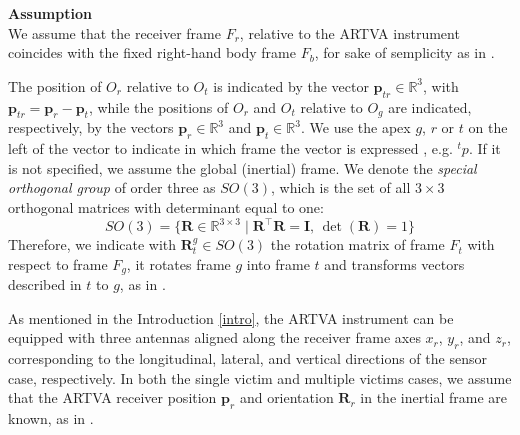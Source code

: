 \noindent
\textbf{Assumption}
\\
We assume that the receiver frame $F_r$, relative to the ARTVA
instrument coincides with the fixed right-hand body frame $F_b$, for sake of semplicity
as in \cite{similar-main}.

The position of $O_r$ relative to $O_t$ is indicated by the vector $\mathbf{p}_{tr} \in \mathbb{R}^3$, with $\mathbf{p}_{tr} = \mathbf{p}_r - \mathbf{p}_t$, 
while the positions of $O_r$ and $O_t$ relative to $O_g$ are indicated, respectively, by the vectors $\mathbf{p}_r \in \mathbb{R}^3$ and $\mathbf{p}_t \in \mathbb{R}^3$.
We use the apex $g$, $r$ or $t$ on the left of the vector to indicate in which frame the vector is expressed , e.g. ${}^t p$. 
If it is not specified, we assume the global (inertial) frame.
We denote the \textit{special orthogonal group} of order three as \( \textit{SO}(3) \), 
which is the set of all \( 3 \times 3 \) orthogonal matrices with determinant equal to one:
\[
\textit{SO}(3) = \{ \mathbf{R} \in \mathbb{R}^{3 \times 3} \mid \mathbf{R}^\top \mathbf{R} = \mathbf{I}, \, \det(\mathbf{R}) = 1 \}
\]
Therefore, we indicate with \( \mathbf{R}^g_t \in \textit{SO}(3) \) the rotation matrix of frame $F_t$ with respect to frame $F_g$,
it rotates frame \( g \) into frame \( t \) and transforms vectors described in $t$ to $g$, as in \cite{book-robotics}.

\noindent
As mentioned in the Introduction \ref{intro}, the ARTVA instrument can be equipped with three antennas aligned along 
the receiver frame axes \( x_r \), \( y_r \), and \( z_r \), corresponding to the longitudinal, 
lateral, and vertical directions of the sensor case, respectively. 
In both the single victim and multiple victims cases, we assume 
that the ARTVA receiver position \( \mathbf{p}_r \) and orientation \( \mathbf{R}_r \) in 
the inertial frame are known, as in \cite{main}. 

